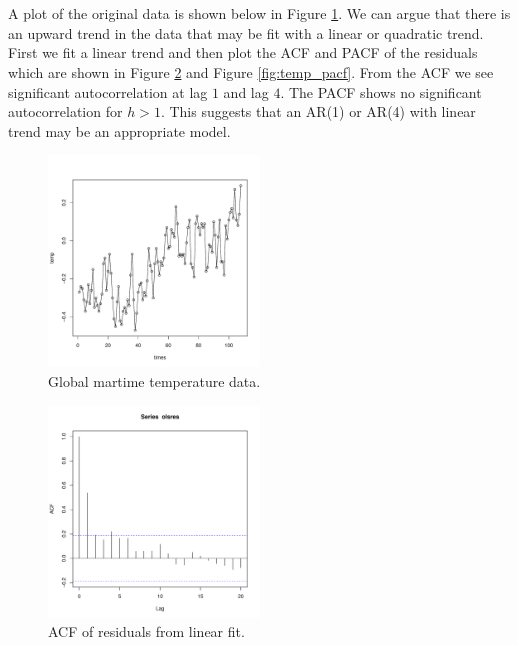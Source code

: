 \documentclass[12pt]{article}
\newenvironment{solution}[2][Solution]{\begin{trivlist}
	\item[\hskip \labelsep {\bfseries #1}]}{\end{trivlist}}
\begin{document}
	\begin{solution}{}
	$ $ \\
	$ $ \\
	A plot of the original data is shown below in Figure \ref{fig:temp_data}. We can argue that there is an upward trend in the data that may be fit with a linear or quadratic trend. \\

	
	First we fit a linear trend and then plot the ACF and PACF of the residuals which are shown in Figure \ref{fig:temp_acf} and Figure \ref{fig:temp_pacf}. From the ACF we see significant autocorrelation at lag $1$ and lag $4$. The PACF shows no significant autocorrelation for $h > 1$. This suggests that an AR(1) or AR(4) with linear trend may be an appropriate model. 
		
	\begin{figure}[H]
    		\centering
    		\includegraphics[width=0.5\textwidth]{figs/problem_6/temp_data.pdf}
    		\caption{Global martime temperature data.}
    		\label{fig:temp_data}
	\end{figure}
	
	\begin{figure}[H]
    		\centering
    		\includegraphics[width=0.5\textwidth]{figs/problem_6/temp_acf.pdf}
    		\caption{ACF of residuals from linear fit.}
    		\label{fig:temp_acf}
	\end{figure}
	

\end{solution}
\end{document}
